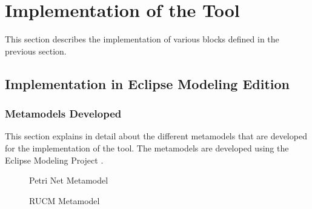 \section{Implementation of the Tool}
This section describes the implementation of various blocks defined in the previous section.

\subsection{Implementation in Eclipse Modeling Edition}
\subsubsection{Metamodels Developed}
This section explains in detail about the different metamodels that are developed for the implementation of the tool. The metamodels are developed using the Eclipse Modeling Project \cite{eclipse}.
\begin{figure}[htb!]
\centering
{}
\caption{Petri Net Metamodel}
\label{fig:petrimetamodel}
\end{figure}

\begin{figure}[htb!]
\centering
{}
\caption{RUCM Metamodel}
\label{fig:rucmmetamodel}
\end{figure}

